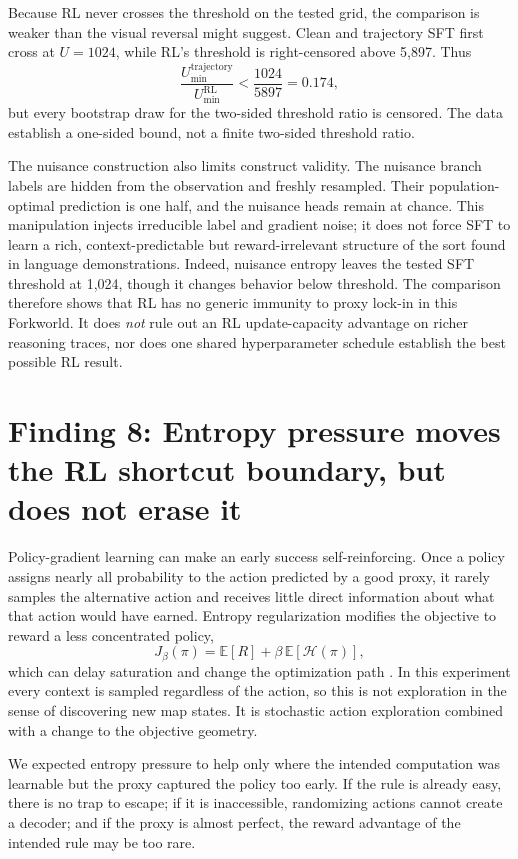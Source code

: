 \documentclass[11pt,a4paper]{article}
\begin{document}
Because RL never crosses the threshold on the tested grid, the comparison is weaker than the visual reversal might suggest. Clean and trajectory SFT first cross at $U=1024$, while RL's threshold is right-censored above 5,897. Thus
\[
\frac{U_{\min}^{\mathrm{trajectory}}}{U_{\min}^{\mathrm{RL}}}
<\frac{1024}{5897}=0.174,
\]
but every bootstrap draw for the two-sided threshold ratio is censored. The data establish a one-sided bound, not a finite two-sided threshold ratio.

The nuisance construction also limits construct validity. The nuisance branch labels are hidden from the observation and freshly resampled. Their population-optimal prediction is one half, and the nuisance heads remain at chance. This manipulation injects irreducible label and gradient noise; it does not force SFT to learn a rich, context-predictable but reward-irrelevant structure of the sort found in language demonstrations. Indeed, nuisance entropy leaves the tested SFT threshold at 1,024, though it changes behavior below threshold. The comparison therefore shows that RL has no generic immunity to proxy lock-in in this Forkworld. It does \emph{not} rule out an RL update-capacity advantage on richer reasoning traces, nor does one shared hyperparameter schedule establish the best possible RL result.

\section*{Finding 8: Entropy pressure moves the RL shortcut boundary, but does not erase it}

Policy-gradient learning can make an early success self-reinforcing. Once a policy assigns nearly all probability to the action predicted by a good proxy, it rarely samples the alternative action and receives little direct information about what that action would have earned. Entropy regularization modifies the objective to reward a less concentrated policy,
\[
J_\beta(\pi)=\mathbb{E}[R]+\beta\,\mathbb{E}[\mathcal H(\pi)],
\]
which can delay saturation and change the optimization path \citep{ahmed2019entropy,husain2021regularized}. In this experiment every context is sampled regardless of the action, so this is not exploration in the sense of discovering new map states. It is stochastic action exploration combined with a change to the objective geometry.

We expected entropy pressure to help only where the intended computation was learnable but the proxy captured the policy too early. If the rule is already easy, there is no trap to escape; if it is inaccessible, randomizing actions cannot create a decoder; and if the proxy is almost perfect, the reward advantage of the intended rule may be too rare.
\end{document}
